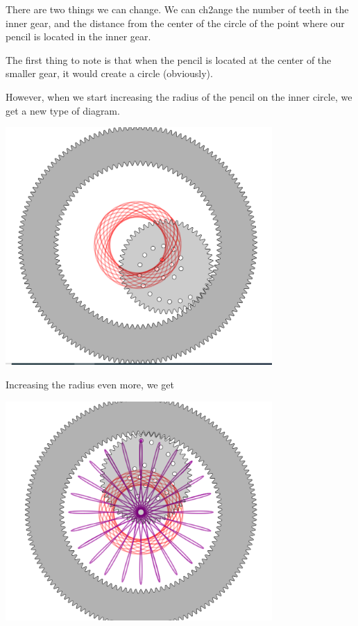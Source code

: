 \documentclass{article}
\begin{document}
There are two things we can change. We can ch2ange the number of teeth in the inner gear, and the distance from the center of the circle of the point where our pencil is located in the inner gear.

The first thing to note is that when the pencil is located at the center of the smaller gear, it would create a circle (obviously).

However, when we start increasing the radius of the pencil on the inner circle, we get a new type of diagram. 

\begin{center}
\includegraphics[width=4in]{images/IncreaseRad1.png}
\end{center}

Increasing the radius even more, we get 

\begin{center}
\includegraphics[width=4in]{images/MaxRad2.png}
\end{center}
\end{document}

